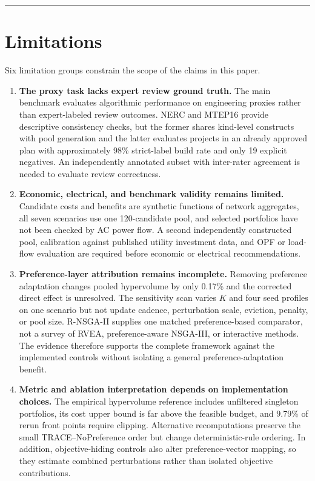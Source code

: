 \documentclass[energies,article,submit,moreauthors]{Definitions/mdpi}
\begin{document}
\begin{center}\rule{0.5\linewidth}{0.5pt}\end{center}

\section{Limitations}\label{limitations}

Six limitation groups constrain the scope of the claims in this paper.

\begin{enumerate}
\def\labelenumi{\arabic{enumi}.}
\item
  \textbf{The proxy task lacks expert review ground truth.} The main benchmark evaluates algorithmic performance on engineering proxies rather than expert-labeled review outcomes. NERC and MTEP16 provide descriptive consistency checks, but the former shares kind-level constructs with pool generation and the latter evaluates projects in an already approved plan with approximately 98\% strict-label build rate and only 19 explicit negatives. An independently annotated subset with inter-rater agreement is needed to evaluate review correctness.
\item
  \textbf{Economic, electrical, and benchmark validity remains limited.} Candidate costs and benefits are synthetic functions of network aggregates, all seven scenarios use one 120-candidate pool, and selected portfolios have not been checked by AC power flow. A second independently constructed pool, calibration against published utility investment data, and OPF or load-flow evaluation are required before economic or electrical recommendations.
\item
  \textbf{Preference-layer attribution remains incomplete.} Removing preference adaptation changes pooled hypervolume by only 0.17\% and the corrected direct effect is unresolved. The sensitivity scan varies \(K\) and four seed profiles on one scenario but not update cadence, perturbation scale, eviction, penalty, or pool size. R-NSGA-II supplies one matched preference-based comparator, not a survey of RVEA, preference-aware NSGA-III, or interactive methods. The evidence therefore supports the complete framework against the implemented controls without isolating a general preference-adaptation benefit.
\item
  \textbf{Metric and ablation interpretation depends on implementation choices.} The empirical hypervolume reference includes unfiltered singleton portfolios, its cost upper bound is far above the feasible budget, and 9.79\% of rerun front points require clipping. Alternative recomputations preserve the small TRACE--NoPreference order but change deterministic-rule ordering. In addition, objective-hiding controls also alter preference-vector mapping, so they estimate combined perturbations rather than isolated objective contributions.

\end{enumerate}
\end{document}
